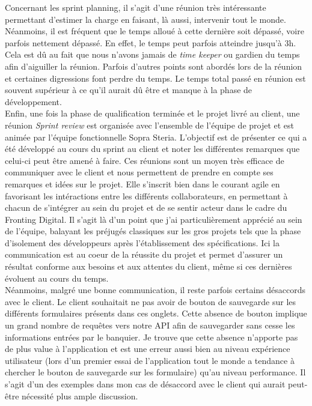 	Concernant les sprint planning, il s'agit d'une réunion très intéressante permettant d'estimer la charge en faisant, là aussi, intervenir tout le monde. Néanmoins, il est fréquent que le temps alloué à cette dernière soit dépassé, voire parfois nettement dépassé. En effet, le temps peut parfois atteindre jusqu'à 3h. Cela est dû au fait que nous n'avons jamais de \textit{time keeper} ou gardien du temps afin d'aiguiller la réunion. Parfois d'autres points sont abordés lors de la réunion et certaines digressions font perdre du temps. Le temps total passé en réunion est souvent supérieur à ce qu'il aurait dû être et manque à la phase de développement. \\
	
	Enfin, une fois la phase de qualification terminée et le projet livré au client, une réunion \textit{Sprint review} est organisée avec l'ensemble de l'équipe de projet et est animée par l'équipe fonctionnelle Sopra Steria. L'objectif est de présenter ce qui a été développé au cours du sprint au client et noter les différentes remarques que celui-ci peut être amené à faire. Ces réunions sont un moyen très efficace de communiquer avec le client et nous permettent de prendre en compte ses remarques et idées sur le projet. Elle s'inscrit bien dans le courant agile en favorisant les intéractions entre les différents collaborateurs, en permettant à chacun de s'intégrer au sein du projet et de se sentir acteur dans le cadre du Fronting Digital. Il s'agit là d'un point que j'ai particulièrement apprécié au sein de l'équipe, balayant les préjugés classiques sur les gros projets tels que la phase d'isolement des développeurs après l'établissement des spécifications. Ici la communication est au coeur de la réussite du projet et permet d'assurer un résultat conforme aux besoins et aux attentes du client, même si ces dernières évoluent au cours du temps. \\
	
	Néanmoins, malgré une bonne communication, il reste parfois certains désaccords avec le client. Le client souhaitait ne pas avoir de bouton de sauvegarde sur les différents formulaires présents dans ces onglets. Cette absence de bouton implique un grand nombre de requêtes vers notre API afin de sauvegarder sans cesse les informations entrées par le banquier. Je trouve que cette absence n'apporte pas de plus value à l'application et est une erreur aussi bien au niveau expérience utilisateur (lors d'un premier essai de l'application tout le monde a tendance à chercher le bouton de sauvegarde sur les formulaire) qu'au niveau performance. Il s'agit d'un des exemples dans mon cas de désaccord avec le client qui aurait peut-être nécessité plus ample discussion.